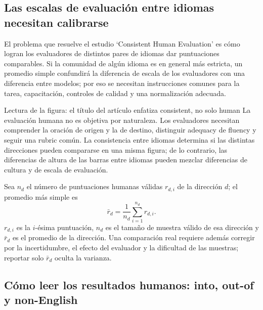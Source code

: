 
\subsection{Las escalas de evaluación entre idiomas necesitan calibrarse}

El problema que resuelve el estudio `Consistent Human Evaluation' es cómo logran los evaluadores de distintos pares de idiomas dar puntuaciones comparables. Si la comunidad de algún idioma es en general más estricta, un promedio simple confundirá la diferencia de escala de los evaluadores con una diferencia entre modelos; por eso se necesitan instrucciones comunes para la tarea, capacitación, controles de calidad y una normalización adecuada.


\begin{knowledgebox}{Lectura de la figura: el título del artículo enfatiza consistent, no solo human}
La evaluación humana no es objetiva por naturaleza. Los evaluadores necesitan comprender la oración de origen y la de destino, distinguir adequacy de fluency y seguir una rubric común. La consistencia entre idiomas determina si las distintas direcciones pueden compararse en una misma figura; de lo contrario, las diferencias de altura de las barras entre idiomas pueden mezclar diferencias de cultura y de escala de evaluación.
\end{knowledgebox}

Sea $n_d$ el número de puntuaciones humanas válidas $r_{d,i}$ de la dirección $d$; el promedio más simple es
\[
\bar r_d=\frac{1}{n_d}\sum_{i=1}^{n_d}r_{d,i}.
\]
$r_{d,i}$ es la $i$-ésima puntuación, $n_d$ es el tamaño de muestra válido de esa dirección y $\bar r_d$ es el promedio de la dirección. Una comparación real requiere además corregir por la incertidumbre, el efecto del evaluador y la dificultad de las muestras; reportar solo $\bar r_d$ oculta la varianza.

\subsection{Cómo leer los resultados humanos: into, out-of y non-English}

